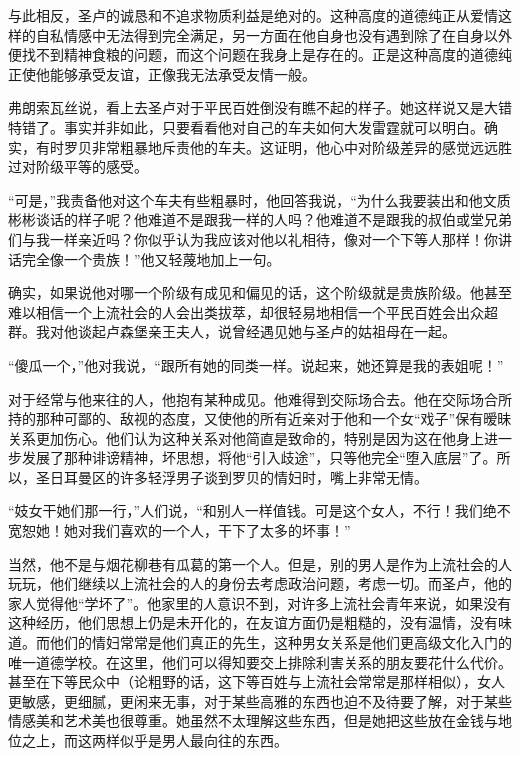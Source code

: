\par 与此相反，圣卢的诚恳和不追求物质利益是绝对的。这种高度的道德纯正从爱情这样的自私情感中无法得到完全满足，另一方面在他自身也没有遇到除了在自身以外便找不到精神食粮的问题，而这个问题在我身上是存在的。正是这种高度的道德纯正使他能够承受友谊，正像我无法承受友情一般。
\par 弗朗索瓦丝说，看上去圣卢对于平民百姓倒没有瞧不起的样子。她这样说又是大错特错了。事实并非如此，只要看看他对自己的车夫如何大发雷霆就可以明白。确实，有时罗贝非常粗暴地斥责他的车夫。这证明，他心中对阶级差异的感觉远远胜过对阶级平等的感受。
\par “可是，”我责备他对这个车夫有些粗暴时，他回答我说，“为什么我要装出和他文质彬彬谈话的样子呢？他难道不是跟我一样的人吗？他难道不是跟我的叔伯或堂兄弟们与我一样亲近吗？你似乎认为我应该对他以礼相待，像对一个下等人那样！你讲话完全像一个贵族！”他又轻蔑地加上一句。
\par 确实，如果说他对哪一个阶级有成见和偏见的话，这个阶级就是贵族阶级。他甚至难以相信一个上流社会的人会出类拔萃，却很轻易地相信一个平民百姓会出众超群。我对他谈起卢森堡亲王夫人，说曾经遇见她与圣卢的姑祖母在一起。
\par “傻瓜一个，”他对我说，“跟所有她的同类一样。说起来，她还算是我的表姐呢！”
\par 对于经常与他来往的人，他抱有某种成见。他难得到交际场合去。他在交际场合所持的那种可鄙的、敌视的态度，又使他的所有近亲对于他和一个女“戏子”保有暧昧关系更加伤心。他们认为这种关系对他简直是致命的，特别是因为这在他身上进一步发展了那种诽谤精神，坏思想，将他“引入歧途”，只等他完全“堕入底层”了。所以，圣日耳曼区的许多轻浮男子谈到罗贝的情妇时，嘴上非常无情。
\par “妓女干她们那一行，”人们说，“和别人一样值钱。可是这个女人，不行！我们绝不宽恕她！她对我们喜欢的一个人，干下了太多的坏事！”
\par 当然，他不是与烟花柳巷有瓜葛的第一个人。但是，别的男人是作为上流社会的人玩玩，他们继续以上流社会的人的身份去考虑政治问题，考虑一切。而圣卢，他的家人觉得他“学坏了”。他家里的人意识不到，对许多上流社会青年来说，如果没有这种经历，他们思想上仍是未开化的，在友谊方面仍是粗糙的，没有温情，没有味道。而他们的情妇常常是他们真正的先生，这种男女关系是他们更高级文化入门的唯一道德学校。在这里，他们可以得知要交上排除利害关系的朋友要花什么代价。甚至在下等民众中（论粗野的话，这下等百姓与上流社会常常是那样相似），女人更敏感，更细腻，更闲来无事，对于某些高雅的东西也迫不及待要了解，对于某些情感美和艺术美也很尊重。她虽然不太理解这些东西，但是她把这些放在金钱与地位之上，而这两样似乎是男人最向往的东西。
